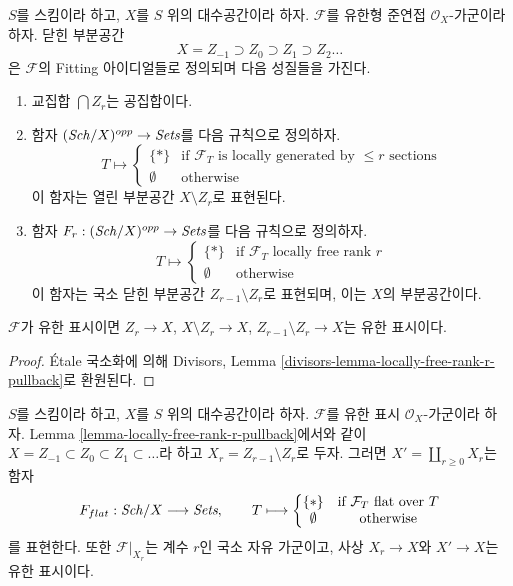 \begin{lemma}
\label{lemma-locally-free-rank-r-pullback}
$S$를 스킴이라 하고, $X$를 $S$ 위의 대수공간이라 하자.
$\mathcal{F}$를 유한형 준연접 $\mathcal{O}_X$-가군이라 하자.
닫힌 부분공간
$$
X = Z_{-1} \supset Z_0 \supset Z_1 \supset Z_2 \ldots
$$
은 $\mathcal{F}$의 Fitting 아이디얼들로 정의되며 다음 성질들을 가진다.
\begin{enumerate}
\item 교집합 $\bigcap Z_r$는 공집합이다.
\item 함자 $(\mathit{Sch}/X)^{opp} \to \textit{Sets}$를 다음 규칙으로 정의하자.
$$
T \longmapsto
\left\{
\begin{matrix}
\{*\} & \text{if }\mathcal{F}_T\text{ is locally generated by }
\leq r\text{ sections} \\
\emptyset & \text{otherwise}
\end{matrix}
\right.
$$
이 함자는 열린 부분공간 $X \setminus Z_r$로 표현된다.
\item 함자 $F_r : (\mathit{Sch}/X)^{opp} \to \textit{Sets}$를 다음 규칙으로 정의하자.
$$
T \longmapsto
\left\{
\begin{matrix}
\{*\} & \text{if }\mathcal{F}_T\text{ locally free rank }r\\
\emptyset & \text{otherwise}
\end{matrix}
\right.
$$
이 함자는 국소 닫힌 부분공간 $Z_{r - 1} \setminus Z_r$로 표현되며, 이는
$X$의 부분공간이다.
\end{enumerate}
$\mathcal{F}$가 유한 표시이면 $Z_r \to X$, $X \setminus Z_r \to X$,
$Z_{r - 1} \setminus Z_r \to X$는 유한 표시이다.
\end{lemma}

\begin{proof}
\'Etale 국소화에 의해 Divisors, Lemma
\ref{divisors-lemma-locally-free-rank-r-pullback}로 환원된다.
\end{proof}

\begin{lemma}
\label{lemma-finite-presentation-module}
$S$를 스킴이라 하고, $X$를 $S$ 위의 대수공간이라 하자.
$\mathcal{F}$를 유한 표시 $\mathcal{O}_X$-가군이라 하자.
Lemma \ref{lemma-locally-free-rank-r-pullback}에서와 같이
$X = Z_{-1} \subset Z_0 \subset Z_1 \subset \ldots$라 하고
$X_r = Z_{r - 1} \setminus Z_r$로 두자. 그러면
$X' = \coprod_{r \geq 0} X_r$는 함자
$$
F_{flat} : \mathit{Sch}/X \longrightarrow \textit{Sets},\quad\quad
T \longmapsto
\left\{
\begin{matrix}
\{*\} & \text{if }\mathcal{F}_T\text{ flat over }T\\
\emptyset & \text{otherwise}
\end{matrix}
\right.
$$
를 표현한다. 또한 $\mathcal{F}|_{X_r}$는 계수 $r$인 국소 자유 가군이고,
사상 $X_r \to X$와 $X' \to X$는 유한 표시이다.
\end{lemma}

